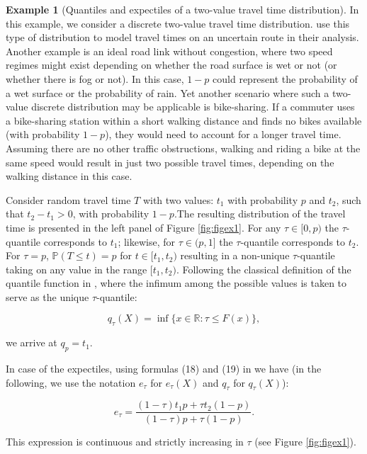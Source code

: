 \documentclass[preprint, 3p, authoryear]{elsarticle} %
\theoremstyle{definition}
\theoremstyle{definition}
\newtheorem{example}{Example}[section]
\theoremstyle{definition}
\theoremstyle{definition}
\theoremstyle{remark}
\begin{document}
\begin{example}[Quantiles and expectiles of a two-value travel time distribution]
\protect\hypertarget{exm:ddqande}{}\label{exm:ddqande}In this example, we consider a discrete two-value travel time distribution. \citet{depalma2006} use this type of distribution to model travel times on an uncertain route in their analysis. Another example is an ideal road link without congestion, where two speed regimes might exist depending on whether the road surface is wet or not (or whether there is fog or not). In this case, \(1-p\) could represent the probability of a wet surface or the probability of rain. Yet another scenario where such a two-value discrete distribution may be applicable is bike-sharing. If a commuter uses a bike-sharing station within a short walking distance and finds no bikes available (with probability \(1-p\)), they would need to account for a longer travel time. Assuming there are no other traffic obstructions, walking and riding a bike at the same speed would result in just two possible travel times, depending on the walking distance in this case.

Consider random travel time \(T\) with two values: \(t_1\) with probability \(p\) and \(t_2\), such that \(t_2-t_1>0\), with probability \(1-p\).The resulting distribution of the travel time is presented in the left panel of Figure \ref{fig:figex1}.
For any \(\tau\in [0,p)\) the \(\tau\)-quantile corresponds to \(t_1\); likewise, for \(\tau\in (p,1]\) the \(\tau\)-quantile corresponds to \(t_2\). For \(\tau=p\), \(\mathbb P(T\leq t) = p\) for \(t\in[t_1,t_2)\) resulting in a non-unique \(\tau\)-quantile taking on any value in the range \([t_1,t_2)\). Following the classical definition of the quantile function in \citet{xiao12}, where the infimum among the possible values is taken to serve as the unique \(\tau\)-quantile:

\begin{equation}q_\tau(X) = \inf\{x\in \mathbb R: \tau\leq F(x)\},\label{eq:inf}
\end{equation}

we arrive at \(q_p = t_1\).

In case of the expectiles, using formulas (18) and (19) in \citet{holzmann2016} we have (in the following, we use the notation \(e_\tau\) for \(e_\tau(X)\) and \(q_\tau\) for \(q_\tau(X)\)):

\[e_\tau = \frac{(1-\tau)t_1p+ \tau t_2(1-p)}{(1-\tau)p + \tau(1-p)}.\]

This expression is continuous and strictly increasing in \(\tau\) (see Figure \ref{fig:figex1}).


\end{example}
\end{document}
